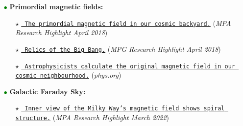 \documentclass[11pt,a4paper,sans, table, dvipsnames]{moderncv}        %
\begin{document}
\begin{itemize}

\item[\textcolor{Green}{$\bullet$}] \textbf{Primordial magnetic fields:} \\
\begin{itemize}
\item[\textcolor{Black}{$\star$}]
\href{https://www.mpa-garching.mpg.de/498249/hl201804}{\texttt{{\color{blue} The primordial magnetic field in our cosmic backyard.}}}
(\textit{MPA Research Highlight April 2018}) 

\item[\textcolor{Black}{$\star$}]
\href{https://www.mpg.de/11991394/relics-of-the-big-bang}{\texttt{{\color{blue} Relics of the Big Bang.}}} (\textit{MPG Research Highlight April 2018})


\item[\textcolor{Black}{$\star$}]
\href{https://phys.org/news/2018-04-astrophysicists-magnetic-field-cosmic-neighbourhood.html}{\texttt{{\color{blue} Astrophysicists calculate the original magnetic field in our cosmic neighbourhood.}}} (\textit{phys.org})
\end{itemize}
\item[\textcolor{Green}{$\bullet$}] \textbf{Galactic Faraday Sky:} \\
\begin{itemize}
\item[\textcolor{Black}{$\star$}]
\href{https://www.mpa-garching.mpg.de/1050627/hl202203}{\texttt{{\color{blue} Inner view of the Milky Way’s magnetic field shows spiral structure.}}} (\textit{MPA Research Highlight March 2022})
\end{itemize}


\end{itemize}
\end{document}
